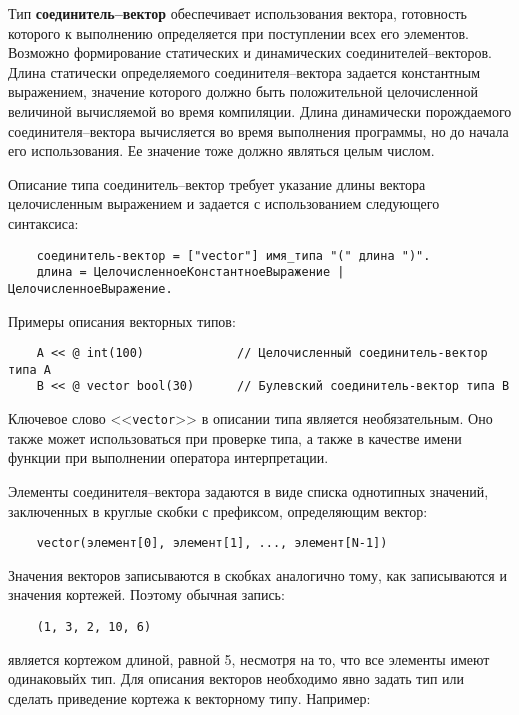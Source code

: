 {Тип \textbf{соединитель--вектор} обеспечивает использования вектора, готовность которого к выполнению определяется при поступлении всех его элементов. Возможно формирование статических и динамических соединителей--векторов. Длина статически определяемого соединителя--вектора задается константным выражением, значение которого должно быть положительной целочисленной величиной вычисляемой во время компиляции. Длина динамически порождаемого соединителя--вектора вычисляется во время выполнения программы, но до начала его использования. Ее значение тоже должно являться целым числом.

Описание типа соединитель--вектор требует указание длины вектора целочисленным выражением и задается с использованием следующего синтаксиса:

\begin{verbatim}
    соединитель-вектор = ["vector"] имя_типа "(" длина ")".
    длина = ЦелочисленноеКонстантноеВыражение | ЦелочисленноеВыражение.
\end{verbatim}

Примеры описания векторных типов:

\begin{verbatim}
    A << @ int(100)             // Целочисленный соединитель-вектор типа А
    B << @ vector bool(30)      // Булевский соединитель-вектор типа B
\end{verbatim}

Ключевое слово <<\verb|vector|>> в описании типа является необязательным. Оно также может использоваться при проверке типа, а также в качестве имени функции при выполнении оператора интерпретации.

Элементы соединителя--вектора задаются в виде списка однотипных значений, заключенных в круглые скобки с префиксом, определяющим вектор:

\begin{verbatim}
    vector(элемент[0], элемент[1], ..., элемент[N-1])
\end{verbatim}
Значения векторов записываются в скобках аналогично тому, как записываются и значения кортежей. Поэтому обычная запись:

\begin{verbatim}
    (1, 3, 2, 10, 6)
\end{verbatim}

является кортежом длиной, равной 5, несмотря на то, что все элементы имеют одинаковыйх тип. Для описания векторов необходимо явно задать тип или сделать приведение кортежа к векторному типу. Например:

}
